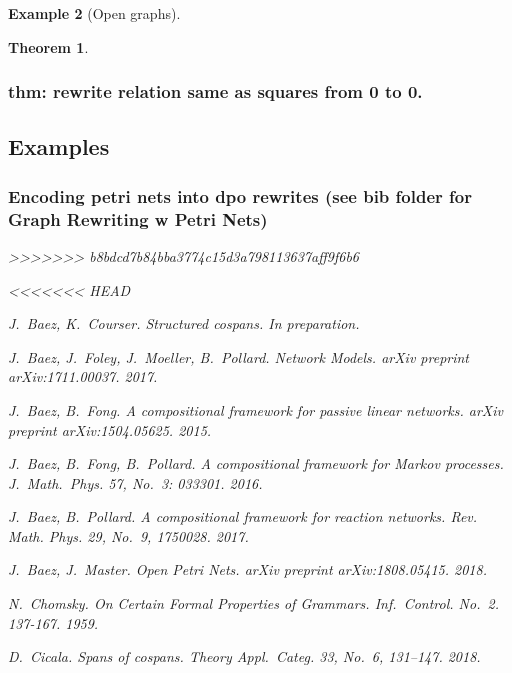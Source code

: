 \documentclass{amsart}
\newtheorem{theorem}{Theorem}[section]
\theoremstyle{remark}
\theoremstyle{definition}
\newtheorem{example}[theorem]{Example}
\begin{document}
\begin{example}[Open graphs]
{{\begin{theorem}
\subsubsection{thm: rewrite relation same as squares from 0 to 0.}
\label{sec-3-4-5}



\subsection{Examples}
\label{sec-3-5}
\subsubsection{Encoding petri nets into dpo rewrites (see bib folder for Graph Rewriting w Petri Nets)}
\label{sec-3-5-1}

>>>>>>> b8bdcd7b84bba3774c15d3a798113637aff9f6b6


% 
% 

\begin{thebibliography}{99}
<<<<<<< HEAD

 J.~Baez, K.~Courser. Structured cospans. \emph{In preparation}.

 J.~Baez, J.~Foley, J.~Moeller, B.~Pollard. Network
  Models. \emph{arXiv preprint} arXiv:1711.00037. 2017.
  
 J.~Baez, B.~Fong. A compositional framework for passive linear networks. \emph{arXiv preprint} arXiv:1504.05625. 2015.

 J.~Baez, B.~Fong, B.~Pollard. A compositional
  framework for Markov processes. \emph{J.~Math.~Phys.} 57, No.~3:
  033301. 2016.
  
 J.~Baez, B.~Pollard. A compositional framework for
  reaction networks. \emph{Rev. Math. Phys.} 29, No.~9, 1750028. 2017.

 J.~Baez, J.~Master. Open Petri Nets. \emph{arXiv preprint} arXiv:1808.05415. 2018.
  
 N.~Chomsky. On Certain Formal Properties of Grammars.
\emph{Inf.~Control}. No.~2. 137-167. 1959. 
  
 D.\ Cicala. Spans of cospans. \emph{Theory Appl.\
    Categ.} 33, No.\ 6, 131--147. 2018.


\end{thebibliography}
\end{theorem}}}
\end{example}
\end{document}
